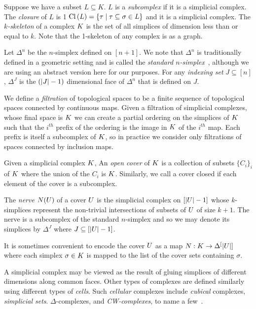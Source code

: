 Suppose we have a subset $L \subseteq K$.  $L$ is a \emph{subcomplex}
if it is a simplicial complex. The \emph{closure} of $L$ is 1
$\operatorname{Cl}{(}L) = \{ \tau \mid \tau \subseteq \sigma \in L\}$ and it is a simplicial complex. The 
\emph{$k$-skeleton} of a complex $K$ is the set of all simplices
of dimension less than or equal to $k$. Note that the 1-skeleton of
any complex is as a graph.

Let $\Delta^n$ be the $n$-simplex defined on $[n+1]$.  We note that 
$\Delta^n$ is traditionally defined in a geometric setting and is
called the \emph{standard $n$-simplex}~\cite{hatcher}, although we 
are using an abstract version here for our purposes. For any
\emph{indexing set} $J \subseteq [n]$, $\Delta^J$ is the $(|J|-1)$ 
dimensional face of $\Delta^n$  that is defined on $J$.

We define a \emph{filtration} of topological spaces to be a finite sequence of topological spaces connected by
continuous maps. Given a filtration of simplicial complexes, whose final space is $K$ we can create a  
partial ordering on the simplices of $K$ such that the $i^{th}$ prefix of the ordering is the image in $K$ of the $i^{th}$ map. Each prefix is itself a subcomplex of $K$, so in practice we consider only filtrations of spaces connected by inclusion maps.

Given a simplicial complex $K$, An \emph{open cover} of $K$ is a collection of subsets $\{C_i\}_i$ of $K$ where the union of the $C_i$ is $K$. Similarly, we call a cover closed if each element of the cover is a subcomplex. 

The \emph{nerve} $N(U)$ of a cover $U$ is the simplicial complex on $[|U|-1]$ whose $k$-simplices 
represent the non-trivial intersections of subsets of $U$ of size $k+1$. The nerve is a subcomplex of the standard $n$-simplex and so we may denote its simplices by $\Delta^J$ where $J \subseteq [|U|-1]$. 

It is sometimes convenient to encode the cover $U$ as a map $N: K \rightarrow \Delta^[|U|]$ where each 
simplex $\sigma \in K$ is mapped to the list of the cover sets containing $\sigma$.

A simplicial complex may be viewed as the result of gluing simplices of 
different dimensions along common faces. Other types of complexes are defined 
similarly using different types of \emph{cells}. Such \emph{cellular} complexes include \emph{cubical} complexes, \emph{simplicial sets}. $\Delta$-complexes, and \emph{CW-complexes}, 
to name a few~\cite{ez-ssc-50,hatcher,kmm-ch-04,m-soat-68}. 

